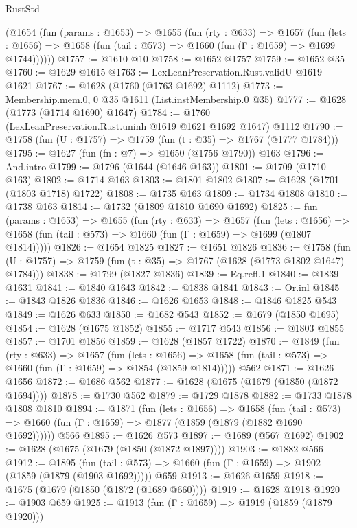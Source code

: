 \begin{lexlean}{RustStd}
\begin{coremodule}
    (@1654
      (fun (params : @1653) =>
      @1655
        (fun (rty : @633) =>
        @1657
          (fun (lets : @1656) =>
          @1658 (fun (tail : @573) => @1660 (fun (Γ : @1659) => @1699 @1744))))))
@1757 := @1610 @10
@1758 := @1652 @1757
@1759 := @1652 @35
@1760 := @1629 @1615
@1763 := LexLeanPreservation.Rust.validU @1619 @1621
@1767 := @1628 (@1760 (@1763 @1692) @1112)
@1773 := Membership.mem.{0, 0} @35 @1611 (List.instMembership.{0} @35)
@1777 := @1628 (@1773 (@1714 @1690) @1647)
@1784 := @1760 (LexLeanPreservation.Rust.uninh @1619 @1621 @1692 @1647) @1112
@1790 := @1758 (fun (U : @1757) => @1759 (fun (t : @35) => @1767 (@1777 @1784)))
@1795 := @1627 (fun (fn : @7) => @1650 (@1756 @1790)) @163
@1796 := And.intro
@1799 := @1796 (@1644 (@1646 @163))
@1801 := @1709 (@1710 @163)
@1802 := @1714 @163
@1803 := @1801 @1802
@1807 := @1628 (@1701 (@1803 @1718) @1722)
@1808 := @1735 @163
@1809 := @1734 @1808
@1810 := @1738 @163
@1814 := @1732 (@1809 @1810 @1690 @1692)
@1825 := fun (params : @1653) =>
  @1655
    (fun (rty : @633) =>
    @1657
      (fun (lets : @1656) =>
      @1658 (fun (tail : @573) => @1660 (fun (Γ : @1659) => @1699 (@1807 @1814)))))
@1826 := @1654 @1825
@1827 := @1651 @1826
@1836 := @1758 (fun (U : @1757) => @1759 (fun (t : @35) => @1767 (@1628 (@1773 @1802 @1647) @1784)))
@1838 := @1799 (@1827 @1836)
@1839 := Eq.refl.{1}
@1840 := @1839 @1631
@1841 := @1840 @1643
@1842 := @1838 @1841
@1843 := Or.inl
@1845 := @1843 @1826 @1836
@1846 := @1626 @1653
@1848 := @1846 @1825 @543
@1849 := @1626 @633
@1850 := @1682 @543
@1852 := @1679 (@1850 @1695)
@1854 := @1628 (@1675 @1852)
@1855 := @1717 @543
@1856 := @1803 @1855
@1857 := @1701 @1856
@1859 := @1628 (@1857 @1722)
@1870 := @1849
    (fun (rty : @633) =>
    @1657
      (fun (lets : @1656) =>
      @1658 (fun (tail : @573) => @1660 (fun (Γ : @1659) => @1854 (@1859 @1814)))))
    @562
@1871 := @1626 @1656
@1872 := @1686 @562
@1877 := @1628 (@1675 (@1679 (@1850 (@1872 @1694))))
@1878 := @1730 @562
@1879 := @1729 @1878
@1882 := @1733 @1878 @1808 @1810
@1894 := @1871
    (fun (lets : @1656) =>
    @1658
      (fun (tail : @573) => @1660 (fun (Γ : @1659) => @1877 (@1859 (@1879 (@1882 @1690 @1692))))))
    @566
@1895 := @1626 @573
@1897 := @1689 (@567 @1692)
@1902 := @1628 (@1675 (@1679 (@1850 (@1872 @1897))))
@1903 := @1882 @566
@1912 := @1895
    (fun (tail : @573) => @1660 (fun (Γ : @1659) => @1902 (@1859 (@1879 (@1903 @1692)))))
    @659
@1913 := @1626 @1659
@1918 := @1675 (@1679 (@1850 (@1872 (@1689 @660))))
@1919 := @1628 @1918
@1920 := @1903 @659
@1925 := @1913 (fun (Γ : @1659) => @1919 (@1859 (@1879 @1920)))

\end{coremodule}
\end{lexlean}
